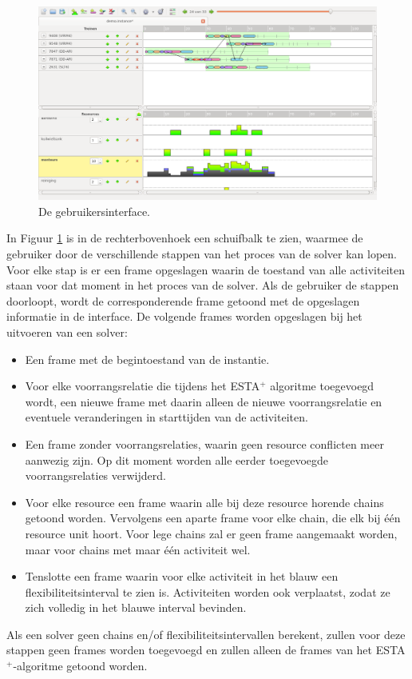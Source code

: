 \begin{figure}[H]
\centering
\includegraphics[width=.95\textwidth]{../images/GUIfinal.png}
\caption{De gebruikersinterface.}
\label{fig:GUIfinal}
\end{figure}

In Figuur \ref{fig:GUIfinal} is in de rechterbovenhoek een schuifbalk te zien, waarmee de gebruiker door de verschillende stappen van het proces van de solver kan lopen. Voor elke stap is er een frame opgeslagen waarin de toestand van alle activiteiten staan voor dat moment in het proces van de solver. Als de gebruiker de stappen doorloopt, wordt de corresponderende frame getoond met de opgeslagen informatie in de interface. De volgende frames worden opgeslagen bij het uitvoeren van een solver:
\begin{itemize}
\item Een frame met de begintoestand van de instantie.
\item Voor elke voorrangsrelatie die tijdens het ESTA$^+$ algoritme toegevoegd wordt, een nieuwe frame met daarin alleen de nieuwe voorrangsrelatie en eventuele veranderingen in starttijden van de activiteiten.
\item Een frame zonder voorrangsrelaties, waarin geen resource conflicten meer aanwezig zijn. Op dit moment worden alle eerder toegevoegde voorrangsrelaties verwijderd.
\item Voor elke resource een frame waarin alle bij deze resource horende chains getoond worden. Vervolgens een aparte frame voor elke chain, die elk bij \'e\'en resource unit hoort. Voor lege chains zal er geen frame aangemaakt worden, maar voor chains met maar \'e\'en activiteit wel.
\item Tenslotte een frame waarin voor elke activiteit in het blauw een flexibiliteitsinterval te zien is. Activiteiten worden ook verplaatst, zodat ze zich volledig in het blauwe interval bevinden.
\end{itemize}
Als een solver geen chains en/of flexibiliteitsintervallen berekent, zullen voor deze stappen geen frames worden toegevoegd en zullen alleen de frames van het ESTA$^+$-algoritme getoond worden.

